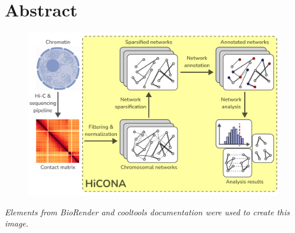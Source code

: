 \graphicspath{{chapters/01_abstract/images}}
\chapter*{Abstract}
\vspace{-1.5cm}

\begin{figure}[h]
  \centering
  \includegraphics[width=1\textwidth]{graphical_abstract.png}
\end{figure}
\vspace{-20pt}
\begin{flushright}
  \small{\textit{Elements from BioRender and cooltools documentation were used to create this image.}}
\end{flushright}
\vspace{10pt}

